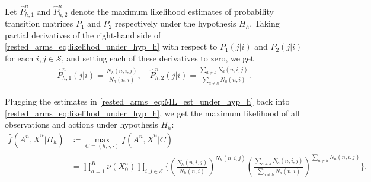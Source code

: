 Let $\hat{P}^n_{h,1}$ and $\hat{P}^n_{h,2}$ denote the maximum likelihood estimates of probability transition matrices $P_1$ and $P_2$ respectively under the hypothesis $H_h$. Taking partial derivatives of the right-hand side of  \eqref{rested_arms_eq:likelihod_under_hyp_h} with respect to $P_1(j|i)$ and $P_2(j|i)$ for each $i,j\in\mathcal{S}$, and setting each of these derivatives to zero, we get
\begingroup\allowdisplaybreaks\begin{align}
	\hat{P}_{h,1}^n(j|i)
	=\frac{N_h(n,i,j)}{N_h(n,i)},\quad
	\hat{P}_{h,2}^n(j|i)
	=\frac{\sum\limits_{a\neq h}N_a(n,i,j)}{\sum\limits_{a\neq h}N_a(n,i)}.\label{rested_arms_eq:ML_est_under_hyp_h}
\end{align}\endgroup

Plugging the estimates in \eqref{rested_arms_eq:ML_est_under_hyp_h}  back into \eqref{rested_arms_eq:likelihod_under_hyp_h}, we get the maximum likelihood of all observations and actions under hypothesis $H_h$:
\begingroup\allowdisplaybreaks\begin{align}
	\hat{f}(A^n,\bar{X}^n|H_h)&\coloneqq\max\limits_{C=(h,\cdot,\cdot)}f(A^n,\bar{X}^n|C)\nonumber\\
	&=\prod\limits_{a=1}^K \nu(X_0^a)\prod\limits_{i,j\in\mathcal{S}}\bigg\lbrace\left(\frac{N_h(n,i,j)}{N_h(n,i)}\right)^{N_h(n,i,j)}
	\left(\frac{\sum\limits_{a\neq h}N_a(n,i,j)}{\sum\limits_{a\neq h}N_a(n,i)}\right)^{\sum\limits_{a\neq h}N_a(n,i,j)}\bigg\rbrace.\label{rested_arms_eq:ml_likelihod_under_hyp_h}
\end{align}\endgroup

